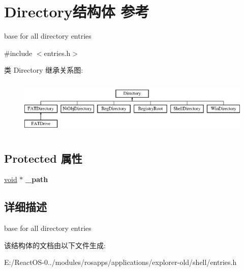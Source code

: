 \hypertarget{struct_directory}{}\section{Directory结构体 参考}
\label{struct_directory}


base for all directory entries  




{\ttfamily \#include $<$entries.\+h$>$}

类 Directory 继承关系图\+:\begin{figure}[H]
\begin{center}
\leavevmode
\includegraphics[height=2.666667cm]{struct_directory}
\end{center}
\end{figure}
\subsection*{Protected 属性}
\begin{DoxyCompactItemize}
\item 
\mbox{\label{struct_directory_ae7f7e34795e1cae1bc0c18a1576929b2}} 
\hyperlink{interfacevoid}{void} $\ast$ {\bfseries \+\_\+path}
\end{DoxyCompactItemize}


\subsection{详细描述}
base for all directory entries 

该结构体的文档由以下文件生成\+:\begin{DoxyCompactItemize}
\item 
E\+:/\+React\+O\+S-\/0../modules/rosapps/applications/explorer-\/old/shell/entries.\+h\end{DoxyCompactItemize}
